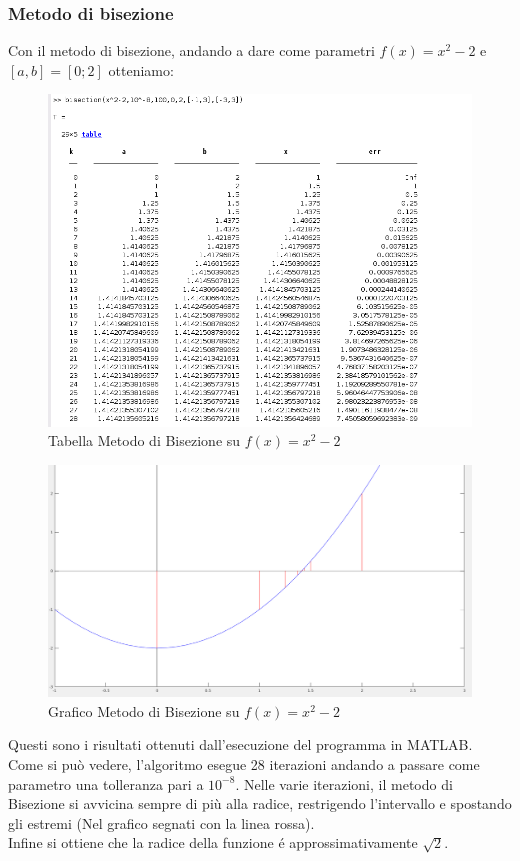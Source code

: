 \documentclass[12pt, letterpaper]{article}
\begin{document}
\subsubsection{Metodo di bisezione}
Con il metodo di bisezione, andando a dare come parametri $f(x)=x^2-2$ e $[a,b]=[0;2]$ otteniamo:
\begin{figure}[ht!]
    \includegraphics[scale=0.63]{TabellaParabolaBisezione.png}
    \caption{Tabella Metodo di Bisezione su $f(x)=x^2-2$}
\end{figure}
\begin{figure}[ht!]
    \includegraphics[scale=0.4]{ParabolaBisezione.png} 
    \caption{Grafico Metodo di Bisezione su $f(x)=x^2-2$}
\end{figure}

Questi sono i risultati ottenuti dall'esecuzione del programma in MATLAB.\\ Come si può vedere, l'algoritmo esegue 28 iterazioni andando a passare come parametro una tolleranza pari a $10^{-8}$.
Nelle varie iterazioni, il metodo di Bisezione si avvicina sempre di più alla radice, restrigendo l'intervallo e spostando gli estremi (Nel grafico segnati con la linea rossa). \\
Infine si ottiene che la radice della funzione \'e approssimativamente $\sqrt{2}$.
\end{document}
